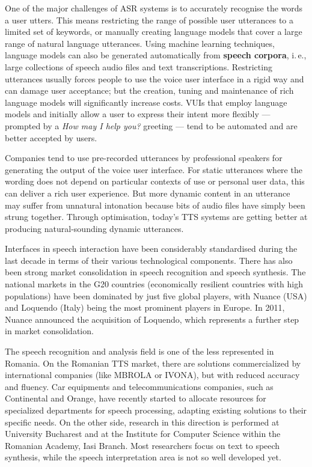 \documentclass[]{../../metanetpaper}
\begin{document}
\begin{multicols}{2}
One of the major challenges of ASR systems is to accurately recognise the words a user utters. This means restricting the range of possible user utterances to a limited set of keywords, or manually creating language models that cover a large range of natural language utterances. Using machine learning techniques, language models can also be generated automatically from \textbf{speech corpora}, i.\,e., large collections of speech audio files and text transcriptions. Restricting utterances usually forces people to use the voice user interface in a rigid way and can damage user acceptance; but the creation, tuning and maintenance of rich language models will significantly increase costs. VUIs that employ language models and initially allow a user to express their intent more flexibly — prompted by a \textit{How may I help you?} greeting — tend to be automated and are better accepted by users.


Companies tend to use pre-recorded utterances by professional speakers for generating the output of the voice user interface. For static utterances where the wording does not depend on particular contexts of use or personal user data, this can deliver a rich user experience. But more dynamic content in an utterance may suffer from unnatural intonation because bits of audio files have simply been strung together. Through optimisation, today’s TTS systems are getting better at producing natural-sounding dynamic utterances.

Interfaces in speech interaction have been considerably standardised during the last decade in terms of their various technological components. There has also been strong market consolidation in speech recognition and speech synthesis. The national markets in the G20 countries (economically resilient countries with high populations) have been dominated by just five global players, with Nuance (USA) and Loquendo (Italy) being the most prominent players in Europe. In 2011, Nuance announced the acquisition of Loquendo, which represents a further step in market consolidation.

The speech recognition and analysis field is one of the less represented in Romania. On the Romanian TTS market, there are solutions commercialized by international companies (like MBROLA or IVONA), but with reduced accuracy and fluency. Car equipments and telecommunications companies, such as Continental and Orange, have recently started to allocate resources for specialized departments for speech processing, adapting existing solutions to their specific needs. On the other side, research in this direction is performed at University Bucharest and at the Institute for Computer Science within the Romanian Academy, Iasi Branch. Most researchers focus on text to speech synthesis, while the speech interpretation area is not so well developed yet. 


\end{multicols}
\end{document}
